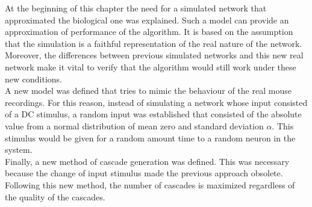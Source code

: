 At the beginning of this chapter the need for a simulated network that approximated the biological one was explained. Such a model can provide an approximation of performance of the algorithm. It is based on the assumption that the simulation is a faithful representation of the real nature of the network. Moreover, the differences between previous simulated networks and this new real network make it vital to verify that the algorithm would still work under these new conditions. \\

A new model was defined that tries to mimic the behaviour of the real mouse recordings. For this reason, instead of simulating a network whose input consisted of a DC stimulus, a random input was established that consisted of the absolute value from a normal distribution of mean zero and standard deviation \(\alpha\). This stimulus would be given for a random amount time to a random neuron in the system. \\

Finally, a new method of cascade generation was defined. This was necessary because the change of input stimulus made the previous approach obsolete. Following this new method, the number of cascades is maximized regardless of the quality of the cascades.







